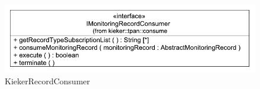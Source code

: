 \documentclass[12pt,journal,a4paper,twocolumn,final,oneside]{IEEEtran}%
\begin{document}
\begin{figure}[h]\centering
\includegraphics[scale=0.65]{figures/model/kieker_RecordConsumer}%
\caption{KiekerRecordConsumer}
\end{figure}

\nocite{vanHoornRohrHasselbringWallerEhlersFreyKieselhorst2009TRContinuousMonitoringOfSoftwareServicesDesignAndApplicationOfTheKiekerFramework,RohrHoornMatevskaStoeverSommerGieseckeHasselbring2008KiekerContinuousMonitoringAndOnDemandVisualizationOfJavaSoftwareBehavior}

\end{document}
